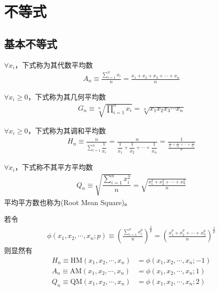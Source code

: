
\chapter{不等式}
\label{chap:inequality}


\section{基本不等式}
\label{sec:basic-inequalities}

\begin{definition}
  $\forall x_i$，下式称为其代数平均数
  \begin{align*}
    A_n\equiv\frac{\sum\limits_{i=1}^{n} x_i}{n}
    =\frac{x_1+x_2+x_3+\cdots+x_n}{n}
  \end{align*}
\end{definition}

\begin{definition}
  $\forall x_i\ge0$，下式称为其几何平均数
  \begin{align*}
    G_n\equiv\sqrt[n]{\prod_{i=1}^{n}x_i}
    =\sqrt[n]{x_1 x_2 x_3\cdots x_n}
  \end{align*}
\end{definition}

\begin{definition}
  $\forall x_i\ge0$，下式称为其调和平均数
  \begin{align*}
    H_n\equiv\frac{n}{\sum\limits_{i=1}^{n}\dfrac1{x_i}}
    =\frac{n}{\dfrac1{x_1}+\dfrac1{x_2}+\cdots+\dfrac1{x_n}}
    =\frac{1}{\frac{\frac1{x_1}+\frac1{x_2}+\cdots+\frac1{x_n}}{n}}
  \end{align*}
\end{definition}

\begin{definition}
  $\forall x_i$，下式称不其平方平均数
  \begin{align*}
    Q_n\equiv\sqrt{\dfrac{\sum\limits_{i=1}^n x_i^2}{n}}
    =\sqrt{\frac{x_1^2+x_2^2+\cdots+x_n^2}{n}}
  \end{align*}
  平均平方数也称为(Root Mean Square)。
\end{definition}

若令
\begin{align*}
  \phi(x_1,x_2,\cdots,x_n;p)\equiv\left(\frac{\sum_{i=1}^{n} x_i^p}{n} \right)^{\frac1p}
  =\left( \frac{x_1^p + x_2^p + \cdots + x_n^p}{n} \right)^{\frac1p}
\end{align*}
则显然有
\begin{align*}
  H_n \equiv \mathrm{HM}(x_1,x_2,\cdots,x_n)&=\phi(x_1,x_2,\cdots,x_n;-1)\\
  A_n \equiv \mathrm{AM}(x_1,x_2,\cdots,x_n)&=\phi(x_1,x_2,\cdots,x_n;1)\\
  Q_n \equiv \mathrm{QM}(x_1,x_2,\cdots,x_n)&=\phi(x_1,x_2,\cdots,x_n;2)
\end{align*}

